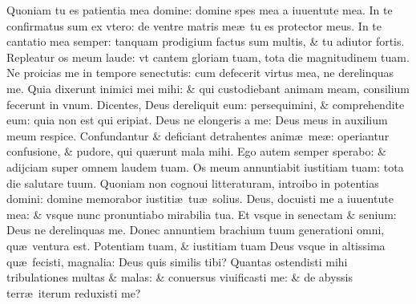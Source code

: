 \documentclass[a5paper,10pt]{book}
\def\ae{æ}
\begin{document}
\begin{multicols*}{2}
\newline \color{red} Q\color{black}uoniam tu es patientia mea domine: domine spes mea a iuuentute mea.
\newline \color{red} I\color{black}n te confirmatus sum ex vtero: de ventre matris me\ae \ tu es protector meus.
\newline \color{red} I\color{black}n te cantatio mea semper: tanquam prodigium factus sum multis, \& tu adiutor fortis.
\newline \color{red} R\color{black}epleatur os meum laude: vt cantem gloriam tuam, tota die magnitudinem tuam.
\newline \color{red} N\color{black}e proicias me in tempore senectutis: cum defecerit virtus mea, ne derelinquas me.
\newline \color{red} Q\color{black}uia dixerunt inimici mei mihi: \& qui custodiebant animam meam, consilium fecerunt in vnum.
\newline \color{red} D\color{black}icentes, Deus dereliquit eum: persequimini, \& comprehendite eum: quia non est qui eripiat.
\newline \color{red} D\color{black}eus ne elongeris a me: Deus meus in auxilium meum respice.
\newline \color{red} C\color{black}onfundantur \& deficiant detrahentes anim\ae \ me\ae : operiantur confusione, \& pudore, qui qu\ae runt mala mihi.
\newline \color{red} E\color{black}go autem semper sperabo: \& adijciam super omnem laudem tuam.
\newline \color{red} O\color{black}s meum annuntiabit iustitiam tuam: tota die salutare tuum.
\newline \color{red} Q\color{black}uoniam non cognoui litteraturam, introibo in potentias domini: domine memorabor iustiti\ae \ tu\ae \ solius.
\newline \color{red} D\color{black}eus, docuisti me a iuuentute mea: \& vsque nunc pronuntiabo mirabilia tua.
\newline \color{red} E\color{black}t vsque in senectam \& senium: Deus ne derelinquas me.
\newline \color{red} D\color{black}onec annuntiem brachium tuum generationi omni, qu\ae \ ventura est.
\newline \color{red} P\color{black}otentiam tuam, \& iustitiam tuam Deus vsque in altissima qu\ae \ fecisti, magnalia: Deus quis similis tibi?
\newline \color{red} Q\color{black}uantas ostendisti mihi tribulationes multas \& malas: \& conuersus viuificasti me: \& de abyssis terr\ae \ iterum reduxisti me?

\end{multicols*}
\end{document}
